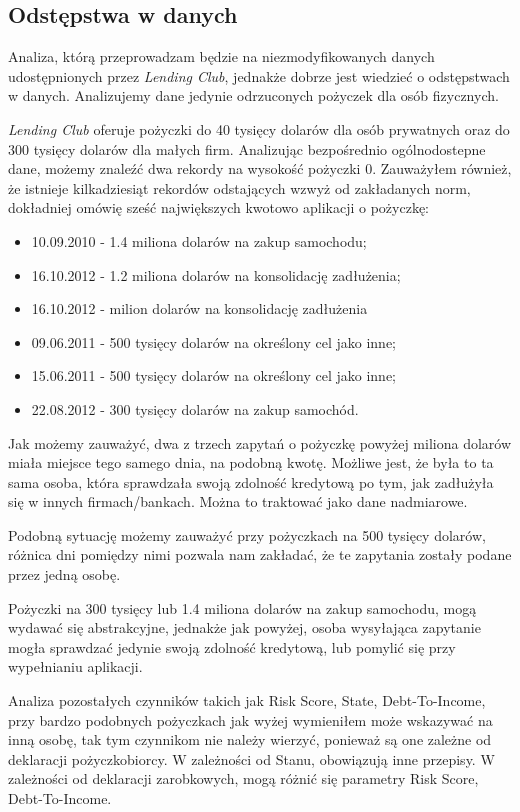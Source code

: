 \documentclass[11pt]{article}
\begin{document}
\subsection{Odstępstwa w danych}

Analiza, którą przeprowadzam będzie na niezmodyfikowanych danych udostępnionych przez \textit{Lending Club}, jednakże dobrze jest wiedzieć o odstępstwach w danych. Analizujemy dane jedynie odrzuconych pożyczek dla osób fizycznych.

\textit{Lending Club} oferuje pożyczki do 40 tysięcy dolarów dla osób prywatnych oraz do 300 tysięcy dolarów dla małych firm. Analizując bezpośrednio ogólnodostepne dane, możemy znaleźć dwa rekordy na wysokość pożyczki 0. Zauważyłem również, że istnieje kilkadziesiąt rekordów odstających wzwyż od zakładanych norm, dokładniej omówię sześć największych kwotowo aplikacji o pożyczkę:
\begin{itemize}
\item 10.09.2010 - 1.4 miliona dolarów na zakup samochodu;
\item 16.10.2012 - 1.2 miliona dolarów na konsolidację zadłużenia;
\item 16.10.2012 - milion dolarów na konsolidację zadłużenia
\item 09.06.2011 - 500 tysięcy dolarów na określony cel jako inne;
\item 15.06.2011 - 500 tysięcy dolarów na określony cel jako inne;
\item 22.08.2012 - 300 tysięcy dolarów na zakup samochód.
\end{itemize}

Jak możemy zauważyć, dwa z trzech zapytań o pożyczkę powyżej miliona dolarów miała miejsce tego samego dnia, na podobną kwotę. Możliwe jest, że była to ta sama osoba, która sprawdzała swoją zdolność kredytową po tym, jak zadłużyła się w innych firmach/bankach. Można to traktować jako dane nadmiarowe.

Podobną sytuację możemy zauważyć przy pożyczkach na 500 tysięcy dolarów, różnica dni pomiędzy nimi pozwala nam zakładać, że te zapytania zostały podane przez jedną osobę.

Pożyczki na 300 tysięcy lub 1.4 miliona dolarów na zakup samochodu, mogą wydawać się abstrakcyjne, jednakże jak powyżej, osoba wysyłająca zapytanie mogła sprawdzać jedynie swoją zdolność kredytową, lub pomylić się przy wypełnianiu aplikacji.

Analiza pozostałych czynników takich jak Risk Score, State, Debt-To-Income, przy bardzo podobnych pożyczkach jak wyżej wymieniłem może wskazywać na inną osobę, tak tym czynnikom nie należy wierzyć, ponieważ są one zależne od deklaracji pożyczkobiorcy. W zależności od Stanu, obowiązują inne przepisy. W zależności od deklaracji zarobkowych, mogą różnić się parametry Risk Score, Debt-To-Income. 
\end{document}
